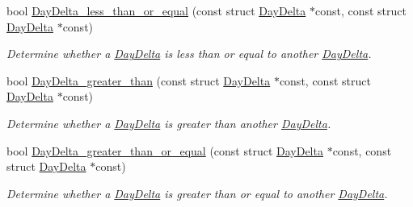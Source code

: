\begin{DoxyCompactItemize}
bool \hyperlink{day-delta_8h_addb9ac5ac217d762aa6bc45c2d5d6136}{\-Day\-Delta\-\_\-less\-\_\-than\-\_\-or\-\_\-equal} (const struct \hyperlink{structDayDelta}{\-Day\-Delta} $\ast$const, const struct \hyperlink{structDayDelta}{\-Day\-Delta} $\ast$const)
\begin{DoxyCompactList}\small\item\em \-Determine whether a \hyperlink{structDayDelta}{\-Day\-Delta} is less than or equal to another \hyperlink{structDayDelta}{\-Day\-Delta}. \end{DoxyCompactList}\item 
bool \hyperlink{day-delta_8h_ac7ac548c954029ed6b237b4e732f67fd}{\-Day\-Delta\-\_\-greater\-\_\-than} (const struct \hyperlink{structDayDelta}{\-Day\-Delta} $\ast$const, const struct \hyperlink{structDayDelta}{\-Day\-Delta} $\ast$const)
\begin{DoxyCompactList}\small\item\em \-Determine whether a \hyperlink{structDayDelta}{\-Day\-Delta} is greater than another \hyperlink{structDayDelta}{\-Day\-Delta}. \end{DoxyCompactList}\item 
bool \hyperlink{day-delta_8h_a241336d3cf0a1c682f730d1ac5ad59a1}{\-Day\-Delta\-\_\-greater\-\_\-than\-\_\-or\-\_\-equal} (const struct \hyperlink{structDayDelta}{\-Day\-Delta} $\ast$const, const struct \hyperlink{structDayDelta}{\-Day\-Delta} $\ast$const)
\begin{DoxyCompactList}\small\item\em \-Determine whether a \hyperlink{structDayDelta}{\-Day\-Delta} is greater than or equal to another \hyperlink{structDayDelta}{\-Day\-Delta}. \end{DoxyCompactList}\end{DoxyCompactItemize}


